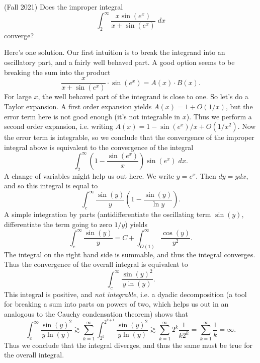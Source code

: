 \documentclass[answers]{exam}
\theoremstyle{problemstyle}
\newcommand{\1}[1]{\textbf{1}_{\left[#1\right]}} %
\begin{document}
\begin{questions}
\question (Fall 2021) Does the improper integral
%
\[ \int_2^\infty \frac{x \sin(e^x)}{x + \sin(e^x)}\; dx \]
%
converge?
\begin{solution}
	Here's one solution. Our first intuition is to break the integrand into an oscillatory part, and a fairly well behaved part. A good option seems to be breaking the sum into the product
	\[ \frac{x}{x + \sin(e^x)} \cdot \sin(e^x) = A(x) \cdot B(x). \]
	For large $x$, the well behaved part of the integrand is close to one. So let's do a Taylor expansion. A first order expansion yields $A(x) = 1 + O(1/x)$, but the error term here is not good enough (it's not integrable in $x$). Thus we perform a second order expansion, i.e. writing $A(x) = 1 - \sin(e^x) / x + O(1/x^2)$. Now the error term is integrable, so we conclude that the convergence of the improper integral above is equivalent to the convergence of the integral
	\[ \int_2^\infty \left( 1 - \frac{\sin(e^x)}{x} \right) \sin(e^x)\; dx. \]
	A change of variables might help us out here. We write $y = e^x$. Then $dy = y dx$, and so this integral is equal to
	\[ \int_c^\infty \frac{\sin(y)}{y} \left( 1 - \frac{\sin(y)}{\ln y} \right). \]
	A simple integration by parts (antidifferentiate the oscillating term $\sin(y)$, differentiate the term going to zero $1/y$) yields
	\[ \int_c^\infty \frac{\sin(y)}{y} = C + \int_{O(1)}^\infty \frac{\cos(y)}{y^2}. \]
	The integral on the right hand side is summable, and thus the integral converges. Thus the convergence of the overall integral is equivalent to
	\[ \int_c^\infty \frac{\sin(y)^2}{y \ln(y)}. \]
	This integral is positive, and \emph{not integrable}, i.e. a dyadic decomposition (a tool for breaking a sum into parts on powers of two, which helps us out in an analogous to the Cauchy condensation theorem) shows that
	\[ \int_c^\infty \frac{\sin(y)^2}{y \ln(y)} \gtrsim \sum_{k = 1}^\infty \int_{2^k}^{2^{k+1}} \frac{\sin(y)^2}{y \ln(y)} \gtrsim \sum_{k = 1}^\infty 2^k \frac{1}{k 2^k} = \sum_{k = 1}^\infty \frac{1}{k} = \infty. \]
	Thus we conclude that the integral diverges, and thus the same must be true for the overall integral.


\end{solution}
\end{questions}
\end{document}
